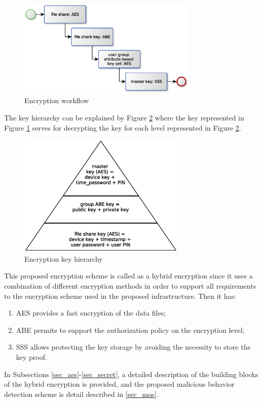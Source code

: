 \documentclass[twocolumn]{svjour3}          %
\begin{document}
\begin{figure}[h!]
	\centering
	\includegraphics[width=8.6cm]{figures/encryptionworkflow.eps}
	\caption{Encryption workflow}
	\label{fig:9}
\end{figure}

The key hierarchy can be explained by Figure \ref{fig:10} where the key represented in Figure \ref{fig:9} serves for decrypting the key for each level represented in Figure \ref{fig:10}.

\begin{figure}[h!]
	\centering
	\includegraphics[width=8cm]{figures/encryptionkeyhierarchy.eps}
	\caption{Encryption key hierarchy}
	\label{fig:10}
\end{figure}

This proposed encryption scheme is called as a hybrid encryption since it uses a combination of different encryption methods in order to support all requirements to the encryption scheme used in the proposed infrastructure. Then it has:
\begin{enumerate}
	\item AES provides a fast encryption of the data files;
	\item ABE permits to support the authorization policy on the encryption level;
	\item SSS allows protecting the key storage by avoiding the necessity to store the key proof.
\end{enumerate}

In Subsections \ref{sec_aes}-\ref{sec_secret}, a detailed description of the building blocks of the hybrid encryption is provided, and the proposed malicious behavior detection scheme is detail described in \ref{sec_mos}.
\end{document}
